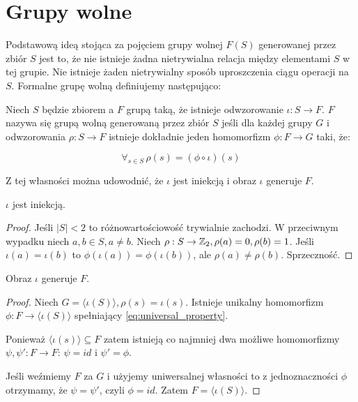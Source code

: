\chapter{Grupy wolne}
\label{ch:free_groups}
Podstawową ideą stojąca za pojęciem grupy wolnej $F(S)$ generowanej przez zbiór
$S$ jest to, że nie istnieje żadna nietrywialna relacja między elementami $S$ w
tej grupie. Nie istnieje żaden nietrywialny sposób uproszczenia ciągu operacji
na $S$. Formalne grupę wolną definiujemy następująco:

\begin{defin}
  Niech $S$ będzie zbiorem a $F$ grupą taką, że istnieje odwzorowanie $\iota: S
  \rightarrow F$. $F$ nazywa się grupą wolną generowaną przez zbiór $S$ jeśli
  dla każdej grupy $G$ i odwzorowania $\rho: S \rightarrow F$ istnieje dokładnie
  jeden homomorfizm $\phi: F \rightarrow G$ taki, że:

  \begin{equation}
  \forall_{s \in S} \,\rho(s) = (\phi \circ \iota) (s)
    \label{eq:universal_property}
  \end{equation}
  \label{def:universal_property}
\end{defin}

Z tej własności można udowodnić, że $\iota$ jest iniekcją i obraz $\iota$
generuje $F$.

\begin{corollary}
  $\iota$ jest iniekcją.
\end{corollary}
\begin{proof}
  Jeśli $|S| < 2$ to różnowartościowość trywialnie zachodzi. W przeciwnym
  wypadku niech $a, b \in S, a \neq b$. Niech $\rho: S \rightarrow \mathbb{Z}_2, \rho(a)
  = 0, \rho(b) = 1$. Jeśli $\iota(a) = \iota(b)$ to $\phi(\iota(a)) =
  \phi(\iota(b))$, ale $\rho(a) \neq \rho(b)$. Sprzeczność.
\end{proof}

\begin{corollary}
  Obraz $\iota$ generuje $F$.
\end{corollary}
\begin{proof}
  Niech $G = \langle \iota(S) \rangle, \rho(s) = \iota(s)$.
  Istnieje unikalny homomorfizm $\phi: F \rightarrow \langle \iota(S) \rangle$
  spełniający \ref{eq:universal_property}.

  Ponieważ $\langle \iota(s) \rangle \subseteq F$ zatem istnieją co najmniej dwa
  możliwe homomorfizmy $\psi, \psi': F \rightarrow F$: $\psi = id$ i
  $\psi' = \phi$.

  Jeśli weźmiemy $F$ za $G$ i użyjemy uniwersalnej własności to z
  jednoznaczności $\phi$ otrzymamy, że $\psi = \psi'$, czyli $\phi = id$. Zatem
  $F = \langle \iota(S)\rangle$.
\end{proof}

